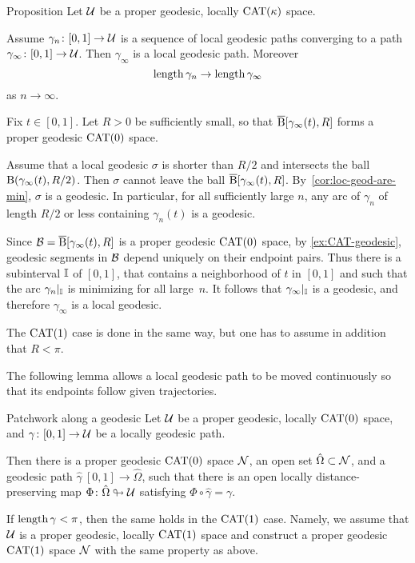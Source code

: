 \begin{thm}{Proposition}\label{prop:geo-complete}
Let $\mathcal{U}$ be a proper geodesic, locally $\mathrm{CAT}(\kappa)$ space.

Assume $\gamma_n\colon[0,1]\to\mathcal{U}$ is a sequence of local geodesic paths converging to a path $\gamma_\infty\colon[0,1]\to\mathcal{U}$.
Then $\gamma_\infty$ is a local geodesic path.
Moreover 
\[\mathop{\rm length}\nolimits\gamma_n\to\mathop{\rm length}\nolimits\gamma_\infty\]
as $n\to\infty$.
\end{thm}

Fix $t\in[0,1]$.  
Let $R>0$ be sufficiently small, so that $\overline{\mathrm{B}}{}[\gamma_\infty(t),R]$ forms a proper geodesic $\mathrm{CAT}(0)$ space.

Assume that  a local geodesic $\sigma$  is shorter than $R/2$ and intersects the ball $\mathrm{B}{}(\gamma_\infty(t),R/2)$.
Then $\sigma$ cannot leave the ball $\overline{\mathrm{B}}{}[\gamma_\infty(t),R]$.
By~\ref{cor:loc-geod-are-min}, $\sigma$ is a geodesic.  
In particular, for all sufficiently large $n$, any arc of $\gamma_n$ of length $R/2$ or less containing $\gamma_n(t)$ is a geodesic.

Since $\mathcal{B}=\overline{\mathrm{B}}{}[\gamma_\infty(t),R]$ is a proper geodesic $\mathrm{CAT}(0)$ space, by \ref{ex:CAT-geodesic},
geodesic segments in $\mathcal{B}$ depend uniquely on their endpoint pairs.  
Thus there is a subinterval $\mathbb{I}$ of $[0,1]$,
that  contains a neighborhood of $t$ in $[0,1]$
and such that the arc $\gamma_n|_{\mathbb{I}}$ is minimizing for all large~$n$.
It follows that $\gamma_\infty|_{\mathbb{I}}$ is a geodesic,
and therefore $\gamma_\infty$ is a local geodesic.

The $\mathrm{CAT}(1)$ case is done in the same way, but one has to assume in addition that $R<\pi$.
\qeds

The following lemma allows a local geodesic path to be moved continuously so that its endpoints follow given trajectories.

\begin{thm}{Patchwork along a geodesic}
\label{lem:patch}
Let $\mathcal{U}$ be a proper geodesic, locally $\mathrm{CAT}(0)$ space, 
and $\gamma\colon[0,1]\to\mathcal{U}$ be a locally geodesic path.

Then there is a proper geodesic  $\mathrm{CAT}(0)$ space   $\mathcal{N}$,
an open set $\hat\Omega\subset \mathcal{N}$,
and a geodesic path $\hat\gamma\:[0,1]\to\hat\Omega$,
such that there is an open locally distance-preserving map 
$\Phi\colon\hat\Omega\looparrowright\mathcal{U}$ satisfying
$\Phi\circ\hat\gamma=\gamma$.

If $\mathop{\rm length}\nolimits\gamma<\pi$,
then the same holds in the $\mathrm{CAT}(1)$ case.
Namely, we assume that $\mathcal{U}$ is a proper geodesic, locally $\mathrm{CAT}(1)$ space and construct a proper geodesic $\mathrm{CAT}(1)$ space $\mathcal{N}$ with the same property as above.
\end{thm}

